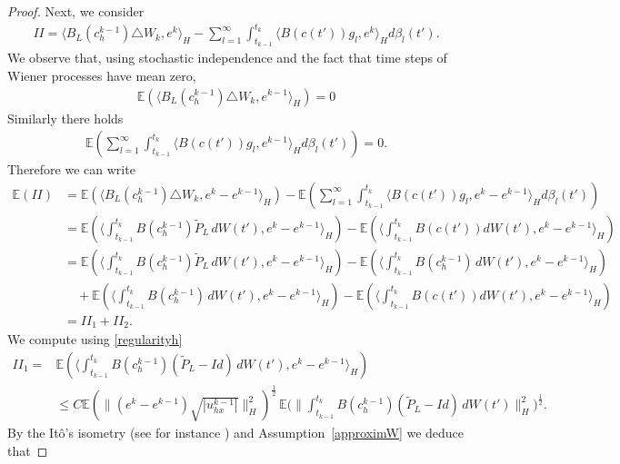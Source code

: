 \documentclass[a4paper,10pt]{article}
\def\Bapprox{B_L}
\def\proj{\tilde{P}}
\numberwithin{equation}{section}
\begin{document}
\begin{proof}
Next, we consider
\begin{align*}
II= \langle \Bapprox(c^{k-1}_{h})\triangle W_{k}, e^{k}\rangle_{H}
-\sum_{l=1}^{\infty}\int_{t_{k-1}}^{t_{k}} \langle B (c(t')) g_{l} , e^{k} \rangle_{H} d \beta_{l}(t') .
\end{align*}
We observe that, using stochastic independence 
and the fact that time steps of Wiener processes have mean zero,
\begin{align*}
\mathbb{E}(\langle \Bapprox(c^{k-1}_{h})\triangle W_{k}, e^{k-1}\rangle_{H} )=0
\end{align*}
Similarly there holds
\begin{align*}
\mathbb{E}\left(\sum_{l=1}^{\infty}\int_{t_{k-1}}^{t_{k}} \langle B (c(t')) g_{l} , e^{k-1} \rangle_{H} d \beta_{l}(t')
 \right)=0.
\end{align*}
Therefore we can write
\begin{align*}
\mathbb{E}(II)&= \mathbb{E} ( \langle \Bapprox(c^{k-1}_{h})\triangle W_{k}, e^{k}-e^{k-1}\rangle_{H} ) - \mathbb{E} (\sum_{l=1}^{\infty}\int_{t_{k-1}}^{t_{k}} \langle B (c(t')) g_{l} , e^{k}-e^{k-1} \rangle_{H} d \beta_{l}(t') )\\
&=\mathbb{E} ( \langle \int_{t_{k-1}}^{t_{k}}B(c^{k-1}_{h}) \proj_{L} \,dW(t'), e^{k}-e^{k-1}\rangle_{H} ) -
\mathbb{E}( \langle \int_{t_{k-1}}^{t_{k}} B (c(t')) dW(t') , e^{k}-e^{k-1} \rangle_{H} )
\\
&=\mathbb{E} ( \langle \int_{t_{k-1}}^{t_{k}}B(c^{k-1}_{h}) \proj_{L} \,dW(t'), e^{k}-e^{k-1}\rangle_{H} )- \mathbb{E} ( \langle \int_{t_{k-1}}^{t_{k}}B(c^{k-1}_{h}) \,dW(t'), e^{k}-e^{k-1}\rangle_{H} )\\
& \quad + \mathbb{E} ( \langle \int_{t_{k-1}}^{t_{k}}B(c^{k-1}_{h}) \,dW(t'), e^{k}-e^{k-1}\rangle_{H} )
- \mathbb{E}( \langle \int_{t_{k-1}}^{t_{k}} B (c(t')) dW(t') , e^{k}-e^{k-1} \rangle_{H} )\\
&=II_{1}+II_{2}.
\end{align*}
We compute using \eqref{regularityh}
\begin{align*}
II_{1}=&\mathbb{E} ( \langle \int_{t_{k-1}}^{t_{k}}B(c^{k-1}_{h}) (\proj_{L}-Id) \,dW(t'), e^{k}-e^{k-1}\rangle_{H} )\\
& \leq C\mathbb{E}(\|( e^{k}-e^{k-1}) \sqrt{|u^{k-1}_{hx}|}\|_{H}^{2})^{\frac{1}{2}}\,
\mathbb{E} \Big( \Big\| \int_{t_{k-1}}^{t_{k}}B(c^{k-1}_{h}) (\proj_{L}-Id) \,dW(t') \Big \|_{H}^{2} \Big)^{\frac{1}{2}}.
\end{align*}
By the It\^o's isometry (see for instance \cite[(10.24)]{Powell}) and Assumption~\ref{approximW} we deduce that

\end{proof}
\end{document}

